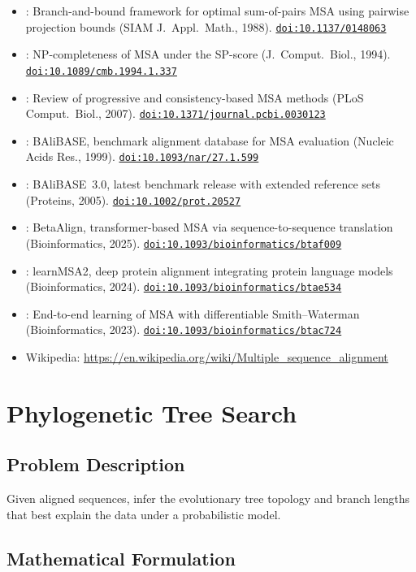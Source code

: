 \documentclass[11pt]{article}
\newcommand{\doi}[1]{\href{https://doi.org/#1}{\texttt{doi:#1}}}
\begin{document}
\begin{itemize}[noitemsep]
  \item \cite{CarrilloLipman1988}: Branch-and-bound framework for optimal sum-of-pairs 
    MSA using pairwise projection bounds (SIAM J.\ Appl.\ Math., 1988).
    \doi{10.1137/0148063}
  \item \cite{WangJiang1994}: NP-completeness of MSA under the SP-score
    (J.\ Comput.\ Biol., 1994). \doi{10.1089/cmb.1994.1.337}
  \item \cite{Notredame2007}: Review of progressive and consistency-based MSA methods
    (PLoS Comput.\ Biol., 2007). \doi{10.1371/journal.pcbi.0030123}
  \item \cite{Thompson1999}: BAliBASE, benchmark alignment database for MSA evaluation
    (Nucleic Acids Res., 1999). \doi{10.1093/nar/27.1.599}
  \item \cite{BAliBASE3}: BAliBASE~3.0, latest benchmark release with extended reference
    sets (Proteins, 2005). \doi{10.1002/prot.20527}
  \item \cite{Dotan2024}: BetaAlign, transformer-based MSA via sequence-to-sequence 
    translation (Bioinformatics, 2025). \doi{10.1093/bioinformatics/btaf009}
  \item \cite{learnMSA2024}: learnMSA2, deep protein alignment integrating protein 
    language models (Bioinformatics, 2024). \doi{10.1093/bioinformatics/btae534}
  \item \cite{Petti2023}: End-to-end learning of MSA with differentiable Smith--Waterman
    (Bioinformatics, 2023). \doi{10.1093/bioinformatics/btac724}
  \item Wikipedia: \url{https://en.wikipedia.org/wiki/Multiple_sequence_alignment}
\end{itemize}

\section{Phylogenetic Tree Search}

\subsection*{Problem Description}

Given aligned sequences, infer the evolutionary tree topology and branch lengths that
best explain the data under a probabilistic model.

\subsection*{Mathematical Formulation}
\end{document}
